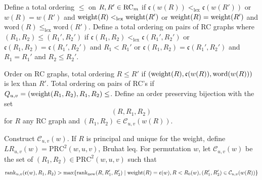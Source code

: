 \documentclass{elsarticle}
\theoremstyle{definition}
\theoremstyle{remark}
\numberwithin{equation}{subsection}
\newcommand{\code}{\mathfrak{c}}
\begin{document}

\newcommand{\prank}{\mathrm{prank}}
\newcommand{\vrank}{\mathrm{vrank}}
\newcommand{\crank}{\mathrm{crank}}
\newcommand{\PRC}{\mathrm{PRC}}
\newcommand{\word}{\mathrm{word}}
\newcommand{\lle}{<_{\mathrm{lex}}}
\newcommand{\lleq}{\leq_{\mathrm{lex}}}
\newcommand{\LR}{\mathcal{C}}
Define a total ordering $\leq$ on $R,R'\in \mathrm{RC}_m$ if $\code(w(R))\lle \code(w(R'))$ or $w(R)=w(R')$ and $\wt(R)\lle \wt(R')$ or $\mathrm{weight}(R)=\mathrm{weight}(R')$ and $\word(R)\lleq \word(R')$. Define a total ordering on pairs of RC graphs where $(R_1,R_2)\leq (R_1',R_2')$ if $\code(R_1,R_2)\lle\code(R_1',R_2')$ or $\code(R_1,R_2)=\code(R_1',R_2')$ and $R_1<R_1'$ or $\code(R_1,R_2)=\code(R_1',R_2')$ and $R_1=R_1'$ and $R_2\leq R_2'$.

\newcommand{\rank}{\mathrm{rank}}
Order on RC graphs, total ordering $R\leq R'$ if $(\wt(R),\code(w(R)),\word(w(R)))$ is lex than $R'$. Total ordering on pairs of RC's if $Q_{u,v}=(\mathrm{weight}(R_1,R_2),R_1,R_2)\leq$. Define an order preserving bijection with the set
$$(R,R_1,R_2)$$
for $R$ any RC graph and $(R_1,R_2)\in \LR_{u,v}(w(R))$.


Construct $\LR_{u,v}(w)$. If $R$ is principal and unique for the weight, define $LR_{u,v}(w)=\PRC^2(w,u,v)$, Bruhat leq. For permutation $w$, let $\LR_{u,v}(w)$ be the set of $(R_1,R_2)\in \PRC^2(w,u,v)$ such that 
$$\rank_{u,v}(\code(w),R_1,R_2)>\max\{\rank_{\mathrm{new}}(R,R_1',R_2')\mid \wt(R)=\code(w),R<R_0(w),(R_1',R_2')\in \LR_{u,v}(w(R))\}$$
\end{document}
